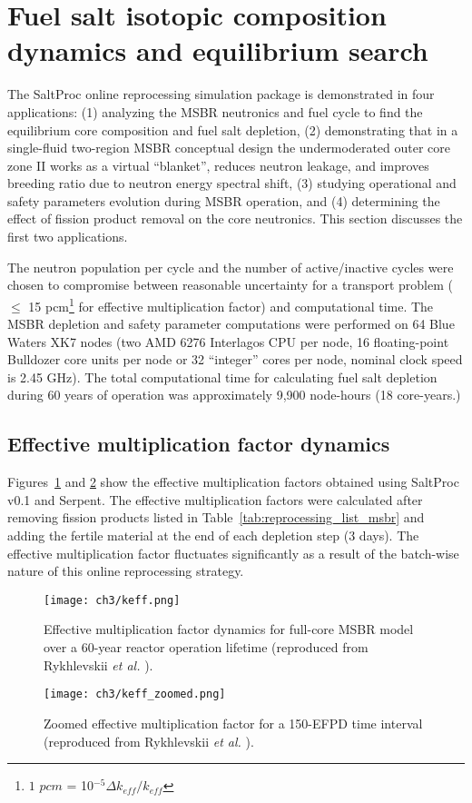 \section{Fuel salt isotopic composition dynamics and equilibrium search}
\label{sec:equilibrium_search}
The SaltProc online reprocessing simulation package is demonstrated in four 
applications: 
(1) analyzing the \gls{MSBR} neutronics and fuel cycle to find 
the equilibrium core composition and fuel salt depletion, 
(2) demonstrating that in a single-fluid two-region \gls{MSBR} conceptual 
design the undermoderated outer core zone II works as a virtual ``blanket'', 
reduces neutron leakage, and improves breeding ratio due to neutron energy 
spectral shift,
(3) studying operational and safety parameters evolution during \gls{MSBR} 
operation, and
(4) determining the effect of fission product removal on the core neutronics. 
This section discusses the first two applications.

The neutron population per cycle and the number of active/inactive cycles were 
chosen to compromise between reasonable uncertainty for a transport 
problem ($\leq$ 15 pcm\footnote{ $1$ $pcm$ = 10$^{-5}\Delta k_{eff}/k_{eff}$} 
for effective multiplication factor) and computational time. The \gls{MSBR} 
depletion and safety parameter computations were performed on 64 Blue Waters 
XK7 nodes (two AMD 6276 Interlagos CPU per node, 16 floating-point Bulldozer 
core units per node or 32 ``integer'' cores per node, nominal clock speed is 
2.45 GHz). The total computational time for calculating fuel salt depletion  
during 60 years of operation was approximately 9,900 node-hours (18 
core-years.)

\subsection{Effective multiplication factor dynamics}
Figures~\ref{fig:keff} and \ref{fig:keff_zoomed} show the effective 
multiplication factors obtained using SaltProc v0.1 and Serpent. The effective 
multiplication factors were calculated after removing fission products listed 
in Table~\ref{tab:reprocessing_list_msbr} and adding the fertile material at 
the end of each depletion step (3 days). The effective multiplication factor 
fluctuates significantly as a result of the batch-wise nature of this online 
reprocessing strategy. 
\begin{figure}[ht!] 
	\centering
	\texttt{[image: ch3/keff.png]}
	\caption{Effective multiplication factor dynamics for full-core \gls{MSBR} 
		model over a 60-year reactor operation lifetime (reproduced 
		from Rykhlevskii \emph{et al.} \cite{rykhlevskii_modeling_2019}).}
	\label{fig:keff}
\end{figure}
\begin{figure}[ht!] 
	\centering
	\texttt{[image: ch3/keff\_zoomed.png]}
	\caption{Zoomed effective multiplication factor for a 150-EFPD time 
	interval (reproduced from Rykhlevskii \emph{et al.}  
	\cite{rykhlevskii_modeling_2019}).}
	\label{fig:keff_zoomed}
\end{figure}

